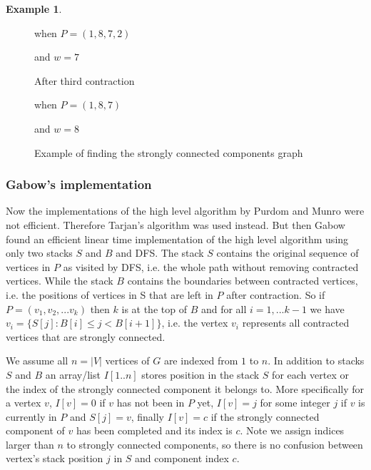 \documentclass{report}
\theoremstyle{plain}
\theoremstyle{definition}
\newtheorem{example}{Example}
\theoremstyle{remark}
\numberwithin{definition}{chapter}
\numberwithin{example}{chapter}
\numberwithin{figure}{chapter}
\begin{document}
\begin{example}
\begin{figure}[h]
when $P=(1,8,7,2)$

and $w=7$
\endminipage\hfill
{}

After third contraction

when $P=(1,8,7)$

and $w=8$
\endminipage\hfill

\caption{Example of finding the strongly connected components graph}
\end{figure}
\label{high_example}
\end{example}

\subsubsection*{Gabow's implementation}

Now the implementations of the high level algorithm by Purdom and Munro were not efficient. Therefore Tarjan's algorithm was used instead. But then Gabow found an efficient linear time implementation of the high level algorithm using only two stacks $S$ and $B$ and DFS. The stack $S$ contains the original sequence of vertices in $P$ as visited by DFS, i.e. the whole path without removing contracted vertices. While the stack $B$ contains the boundaries between contracted vertices, i.e. the positions of vertices in S that are left in $P$ after contraction. So if $P=(v_1, v_2,...v_k)$ then $k$ is at the top of $B$ and for all $i = 1,...k-1$ we have $v_i=\{ S[j] : B[i] \leq j < B[i+1] \}$, i.e. the vertex $v_i$ represents all contracted vertices that are strongly connected.

We assume all $n=|V|$ vertices of $G$ are indexed from $1$ to $n$. In addition to stacks $S$ and $B$ an array/list $I[1..n]$ stores position in the stack $S$ for each vertex or the index of the strongly connected component it belongs to.  More specifically for a vertex $v$, $I[v] = 0$ if $v$ has not been in $P$ yet, $I[v]=j$ for some integer $j$ if $v$ is currently in $P$ and $S[j]=v$, finally $I[v]=c$ if the strongly connected component of $v$ has been completed and its index is $c$. Note we assign indices larger than $n$ to strongly connected components, so there is no confusion between vertex's stack position $j$ in $S$ and component index $c$.
\end{document}
